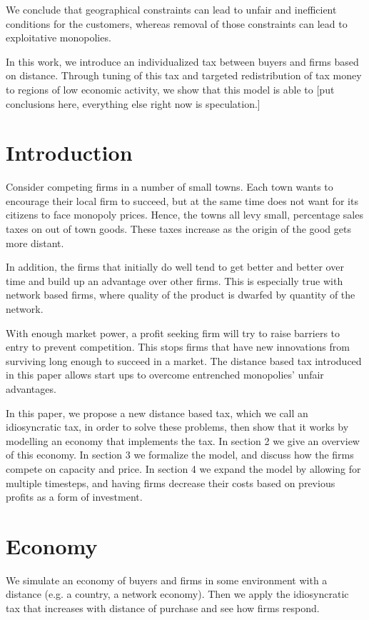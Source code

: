 \documentclass[11pt]{article}
\begin{document}
We conclude that geographical constraints can lead to unfair and inefficient
conditions for the customers, whereas removal of those constraints can lead to
exploitative monopolies.

In this work, we introduce an individualized tax between buyers and firms based
on distance. Through tuning of this tax and targeted redistribution of tax
money to regions of low economic activity, we show that this model is able to
[put conclusions here, everything else right now is speculation.]

\section{Introduction}
Consider competing firms in a number of small towns. Each town wants to
encourage their local firm to succeed, but at the same time does not want for
its citizens to face monopoly prices. Hence, the towns all levy small,
percentage sales taxes on out of town goods. These taxes increase as the origin
of the good gets more distant.

In addition, the firms that initially do well tend to get better and better
over time and build up an advantage over other firms. This is especially true
with network based firms, where quality of the product is dwarfed by quantity
of the network. 

With enough market power, a profit seeking firm will try to raise barriers to
entry to prevent competition. This stops firms that have new innovations from
surviving long enough to succeed in a market. The distance based tax introduced
in this paper allows start ups to overcome entrenched monopolies' unfair
advantages.

In this paper, we propose a new distance based tax, which we call an
idiosyncratic tax, in order to solve these
problems, then show that it works by modelling an economy that implements the
tax. In section 2 we give an overview of this economy. In section 3 we
formalize the model, and discuss how the firms compete on capacity and price.
In section 4 we expand the model by allowing for multiple timesteps, and having
firms decrease their costs based on previous profits as a form of investment.

\section{Economy}
We simulate an economy of buyers and firms in some environment with a distance
(e.g. a country, a network economy). Then we apply the idiosyncratic tax that
increases with distance of purchase and see how firms respond. 
\end{document}
